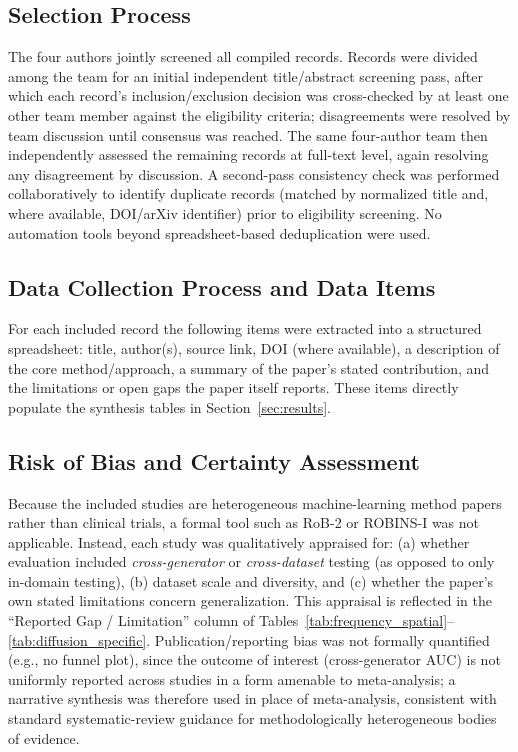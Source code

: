 \documentclass[sn-mathphys-num,Numbered,pdflatex]{sn-jnl}
\begin{document}
\subsection{Selection Process}
The four authors jointly screened all compiled records. Records were divided among the team for an initial independent title/abstract screening pass, after which each record's inclusion/exclusion decision was cross-checked by at least one other team member against the eligibility criteria; disagreements were resolved by team discussion until consensus was reached. The same four-author team then independently assessed the remaining records at full-text level, again resolving any disagreement by discussion. A second-pass consistency check was performed collaboratively to identify duplicate records (matched by normalized title and, where available, DOI/arXiv identifier) prior to eligibility screening. No automation tools beyond spreadsheet-based deduplication were used.

\subsection{Data Collection Process and Data Items}
For each included record the following items were extracted into a structured spreadsheet: title, author(s), source link, DOI (where available), a description of the core method/approach, a summary of the paper's stated contribution, and the limitations or open gaps the paper itself reports. These items directly populate the synthesis tables in Section~\ref{sec:results}.

\subsection{Risk of Bias and Certainty Assessment}
Because the included studies are heterogeneous machine-learning method papers rather than clinical trials, a formal tool such as RoB-2 or ROBINS-I was not applicable. Instead, each study was qualitatively appraised for: (a) whether evaluation included \emph{cross-generator} or \emph{cross-dataset} testing (as opposed to only in-domain testing), (b) dataset scale and diversity, and (c) whether the paper's own stated limitations concern generalization. This appraisal is reflected in the ``Reported Gap / Limitation'' column of Tables~\ref{tab:frequency_spatial}--\ref{tab:diffusion_specific}. Publication/reporting bias was not formally quantified (e.g., no funnel plot), since the outcome of interest (cross-generator AUC) is not uniformly reported across studies in a form amenable to meta-analysis; a narrative synthesis was therefore used in place of meta-analysis, consistent with standard systematic-review guidance for methodologically heterogeneous bodies of evidence.
\end{document}
